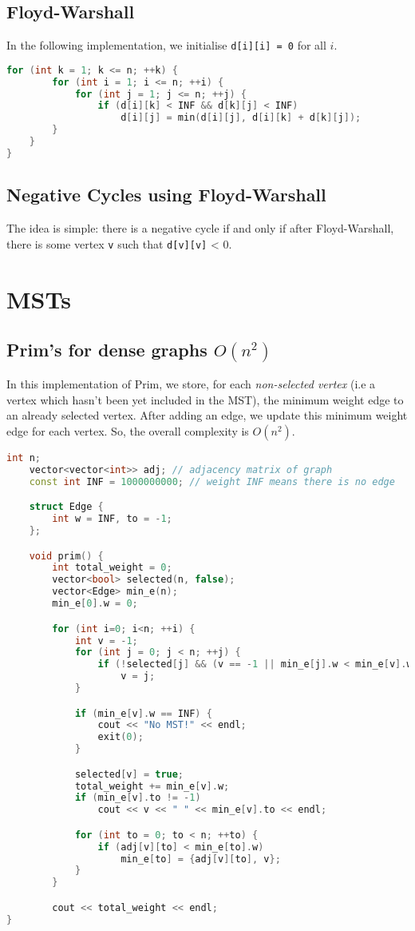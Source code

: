 \documentclass[12pt,a4paper]{amsart}
\numberwithin{equation}{section}
\theoremstyle{definition}
\begin{document}
\subsection{Floyd-Warshall} In the following implementation, we initialise \verb|d[i][i] = 0| for all $i$. 

\begin{lstlisting}[language=C++]
    for (int k = 1; k <= n; ++k) {
        for (int i = 1; i <= n; ++i) {
            for (int j = 1; j <= n; ++j) {
                if (d[i][k] < INF && d[k][j] < INF)
                    d[i][j] = min(d[i][j], d[i][k] + d[k][j]); 
        }
    }
}
\end{lstlisting}
 
\subsection{Negative Cycles using Floyd-Warshall} The idea is simple: there is a negative cycle if and only if after Floyd-Warshall, there is some vertex \verb|v| such that \verb|d[v][v]| < 0. 

\section{MSTs}
\subsection{Prim's for dense graphs $O(n^2)$} In this implementation of Prim, we store, for each \textit{non-selected vertex} (i.e a vertex which hasn't been yet included in the MST), the minimum weight edge to an already selected vertex. After adding an edge, we update this minimum weight edge for each vertex. So, the overall complexity is $O(n^2)$.

\begin{lstlisting}[language=C++]
    int n;
    vector<vector<int>> adj; // adjacency matrix of graph
    const int INF = 1000000000; // weight INF means there is no edge

    struct Edge {
        int w = INF, to = -1;
    };

    void prim() {
        int total_weight = 0;
        vector<bool> selected(n, false);
        vector<Edge> min_e(n);
        min_e[0].w = 0;

        for (int i=0; i<n; ++i) {
            int v = -1;
            for (int j = 0; j < n; ++j) {
                if (!selected[j] && (v == -1 || min_e[j].w < min_e[v].w))
                    v = j;
            }

            if (min_e[v].w == INF) {
                cout << "No MST!" << endl;
                exit(0);
            }

            selected[v] = true;
            total_weight += min_e[v].w;
            if (min_e[v].to != -1)
                cout << v << " " << min_e[v].to << endl;

            for (int to = 0; to < n; ++to) {
                if (adj[v][to] < min_e[to].w)
                    min_e[to] = {adj[v][to], v};
            }
        }

        cout << total_weight << endl;
}
\end{lstlisting}
\end{document}
